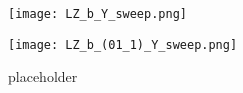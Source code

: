 \begin{figure}[!th]
\centering
\begin{subfigure}[h]{\textwidth}
\centering
\texttt{[image: LZ\_b\_Y\_sweep.png]}
\caption{}
\label{subfig:LZsweepYandb}
\end{subfigure}
%
\begin{subfigure}[h]{\textwidth}
\centering
\texttt{[image: LZ\_b\_(01\_1)\_Y\_sweep.png]}
\caption{placeholder}
\end{subfigure}
\caption{}
\end{figure}